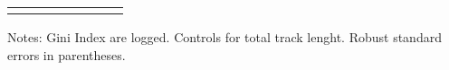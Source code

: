\begin{table}[H]
{\begin{threeparttable}
\begin{tabular}{lccccccc}
\bottomrule[0.5pt]                                                                               \label{tab:table2}                                                                       \end{tabular}                                                                                                    \vspace{-13pt}                                                                                           \begin{tablenotes}[flushleft]{\setlength{\itemindent}{-3pt}}          \small                                                                                                           \item Notes: Gini Index are logged. Controls for total track lenght. Robust standard errors in   parentheses.            \end{tablenotes}                                                                                         \end{threeparttable}                                                                             }                                                                                                                        \end{table}
